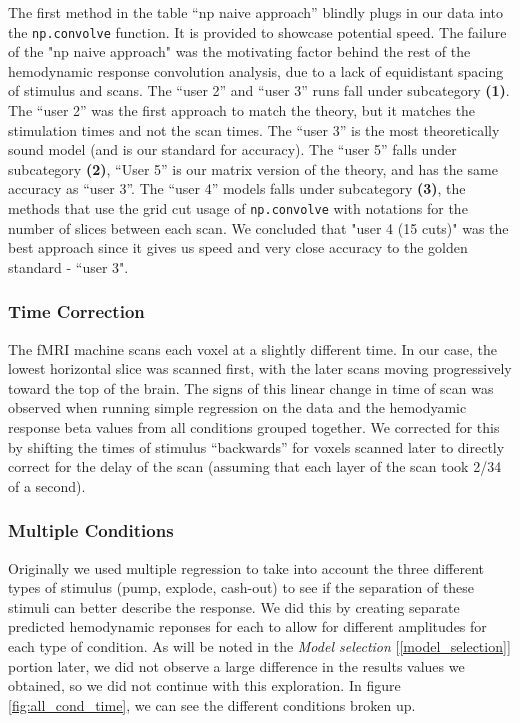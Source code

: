 \par \noindent The first method in the table ``np naive approach'' blindly 
plugs in our data into the \texttt{np.convolve} function. It is provided to 
showcase potential speed. The failure of the "np naive approach" was the 
motivating factor behind the rest of the hemodynamic response convolution 
analysis, due to a lack of equidistant spacing of stimulus and scans. The 
``user 2'' and ``user 3'' runs fall under subcategory 
\textbf{(1)}. The ``user 2'' was the first approach to
match the theory, but it matches the stimulation times and not the scan times.
The ``user 3'' is the most theoretically sound model (and is our standard for 
accuracy). The ``user 5'' falls under subcategory \textbf{(2)}, ``User 5''  is
our matrix version of the theory, and has the same accuracy as ``user 3''. The 
``user 4'' models falls under subcategory \textbf{(3)}, the methods that use the
grid cut usage of \texttt{np.convolve} with notations for the number of slices 
between each scan. We concluded that "user 4 (15 cuts)" was the best approach 
since it gives us speed and very close accuracy to the golden standard - ``user 
3".

\subsubsection{Time Correction}

\par \indent The fMRI machine scans each voxel at a slightly different time. 
In our case, the lowest horizontal slice was scanned first, with the later 
scans moving progressively toward the top of the brain. The signs of this 
linear change in time of scan was observed when running simple regression on 
the data and the hemodyamic response beta values from all conditions grouped 
together. We corrected for this  by shifting the times of stimulus 
``backwards'' for voxels scanned later to directly correct for the delay of 
the scan (assuming that each layer of the scan took 2/34 of a second).

\subsubsection{Multiple Conditions}

\par \indent Originally we used multiple regression to take into account the 
three different types of stimulus (pump, explode, cash-out) to see if the 
separation of these stimuli can better describe the response. We did this by 
creating separate predicted hemodynamic reponses for each to allow for 
different amplitudes for each type of condition. As will be noted in the 
\textit{Model selection} [\ref{model_selection}] portion later, we did not 
observe a large difference in
the results values we obtained, so we did not continue with this exploration. 
In figure \ref{fig:all_cond_time}, we can see the different conditions broken 
up.


